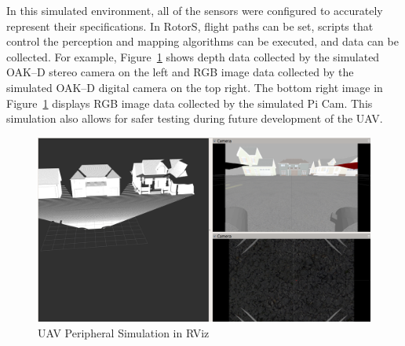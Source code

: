 \documentclass[letterpaper, 12 pt, conference]{ieeeconf}
\begin{document}
In this simulated environment, all of the sensors were configured to accurately represent their specifications. In RotorS, flight paths can be set, scripts that control the perception and mapping algorithms can be executed, and data can be collected. For example, Figure~\ref{fig:RViz} shows depth data collected by the simulated OAK--D stereo camera on the left and RGB image data collected by the simulated OAK--D digital camera on the top right. The bottom right image in Figure~\ref{fig:RViz} displays RGB image data collected by the simulated Pi Cam. This simulation also allows for safer testing during future development of the UAV.
% 
\begin{figure}[tb]
\vspace{0.05in}
\centering
\includegraphics[page=3,width=\columnwidth]{TDR/Figures/RViz.png}
\caption{UAV Peripheral Simulation in RViz}
\label{fig:RViz}
\end{figure}
%
\end{document}
